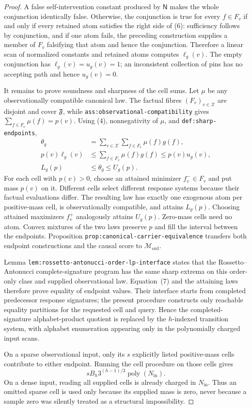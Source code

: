 \documentclass{article}
\begin{document}
\begin{proof}
A false self-intervention constant produced by \(\mathsf N\) makes the whole conjunction identically false.  Otherwise, the conjunction is true for every \(f\in F_v\) if and only if every retained atom satisfies the right side of (6): sufficiency follows by conjunction, and if one atom fails, the preceding construction supplies a member of \(F_v\) falsifying that atom and hence the conjunction.  Therefore a linear scan of normalized constants and retained atoms computes \(\ell_g(v)\).  The empty conjunction has \(\ell_g(v)=u_g(v)=1\); an inconsistent collection of pins has no accepting path and hence \(u_g(v)=0\).

It remains to prove soundness and sharpness of the cell sums.  Let \(\mu\) be any observationally compatible canonical law.  The factual fibres \((F_v)_{v\in\mathcal X}\) are disjoint and cover \(\mathfrak F\), while \texttt{ass:observational-compatibility} gives \(\sum_{f\in F_v}\mu(f)=p(v)\).  Using (4), nonnegativity of \(\mu\), and \texttt{def:sharp-endpoints},
\[
 \begin{aligned}
 \theta_g
 &=\sum_{v\in\mathcal X}\sum_{f\in F_v}\mu(f)g(f),\\
 p(v)\ell_g(v)
 &\leq\sum_{f\in F_v}\mu(f)g(f)
 \leq p(v)u_g(v),\\
 L_g(p)&\leq\theta_g\leq U_g(p).
 \end{aligned}
\tag{7}
\]
For each cell with \(p(v)>0\), choose an attained minimizer \(f_v^-\in F_v\) and put mass \(p(v)\) on it.  Different cells select different response systems because their factual evaluations differ.  The resulting law has exactly one exogenous atom per positive-mass cell, is observationally compatible, and attains \(L_g(p)\).  Choosing attained maximizers \(f_v^+\) analogously attains \(U_g(p)\).  Zero-mass cells need no atom.  Convex mixtures of the two laws preserve \(p\) and fill the interval between the endpoints.  Proposition \texttt{prop:canonical-carrier-equivalence} transfers both endpoint constructions and the causal score to \(\mathcal M_{\mathrm{ord}}\).

Lemma \texttt{lem:rossetto-antonucci-order-lp-interface} states that the Rossetto--Antonucci complete-signature program has the same sharp extrema on this order-only class and supplied observational law.  Equation~(7) and the attaining laws therefore prove equality of endpoint values.  Their interface starts from completed predecessor response signatures; the present procedure constructs only reachable equality partitions for the requested cell and query.  Hence the completed-signature alphabet-product quotient is replaced by the \(h\)-indexed transition system, with alphabet enumeration appearing only in the polynomially charged input scans.

On a sparse observational input, only its \(s\) explicitly listed positive-mass cells contribute to either endpoint.  Running the cell procedure on those cells gives
\[
 sB_h3^{(h-1)/3}\operatorname{poly}(N_{\mathrm{in}}).
\]
On a dense input, reading all supplied cells is already charged in \(N_{\mathrm{in}}\).  Thus an omitted sparse cell is used only because its supplied mass is zero, never because a sample zero was silently treated as a structural impossibility.
\end{proof}
\end{document}
